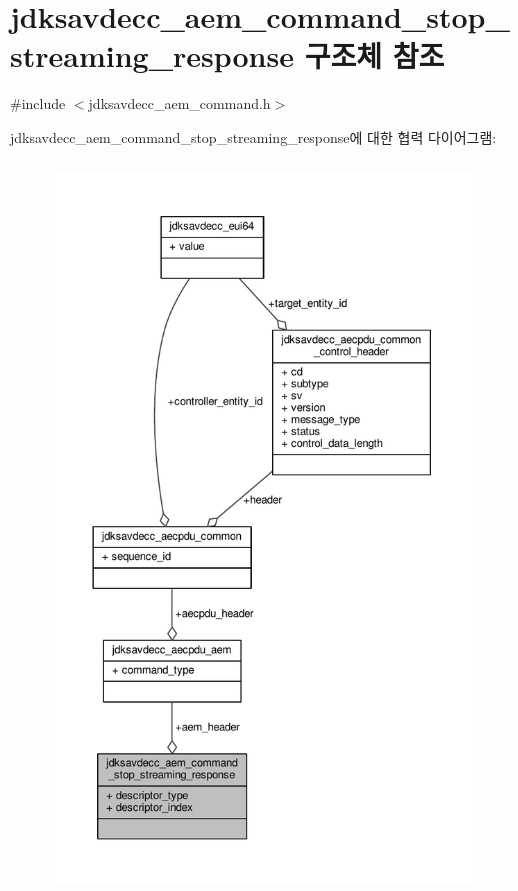 \hypertarget{structjdksavdecc__aem__command__stop__streaming__response}{}\section{jdksavdecc\+\_\+aem\+\_\+command\+\_\+stop\+\_\+streaming\+\_\+response 구조체 참조}
\label{structjdksavdecc__aem__command__stop__streaming__response}


{\ttfamily \#include $<$jdksavdecc\+\_\+aem\+\_\+command.\+h$>$}



jdksavdecc\+\_\+aem\+\_\+command\+\_\+stop\+\_\+streaming\+\_\+response에 대한 협력 다이어그램\+:
\nopagebreak
\begin{figure}[H]
\begin{center}
\leavevmode
\includegraphics[height=550pt]{structjdksavdecc__aem__command__stop__streaming__response__coll__graph}
\end{center}
\end{figure}

